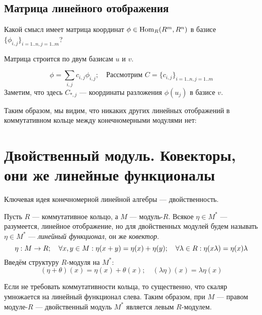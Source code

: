 \documentclass[a4paper]{report}
\begin{document}
    \subsection{Матрица линейного отображения}
    Какой смысл имеет матрица координат $\phi \in \Hom_R(\ind{}R{^m}, \ind{}R{^n})$ в базисе $\{\phi_{i,j}\}_{i = 1..n, j = 1..m}$?

    Матрица строится по двум базисам $u$ и $v$.

    \[\phi = \sum\limits_{i,j}c_{i,j}\phi_{i,j}; \quad \text{Рассмотрим } C = \{c_{i,j}\}_{i=1..n,j=1..m}\]
    Заметим, что здесь $C_{*,j}$ --- координаты разложения $\phi(u_j)$ в базисе $v$.

    Таким образом, мы видим, что никаких других линейных отображений в коммутативном кольце между конечномерными модулями нет:


    \section{Двойственный модуль. Ковекторы, они же линейные функционалы}
    Ключевая идея конечномерной линейной алгебры --- двойственность.

    Пусть $R$ --- коммутативное кольцо, а $M$ --- модуль-$R$.
    Всякое $\eta \in M^*$ --- разумеется, линейное отображение, но для двойственных модулей будем называть $\eta \in M^*$ --- \emph{линейный функционал}, он же \emph{ковектор}.
    \[\eta: M \rightarrow R;\quad \forall x, y \in M: \eta(x + y) = \eta(x) + \eta(y);\quad \forall \lambda \in R: \eta(x \lambda) = \eta(x) \lambda\]
    Введём структуру $R$-модуля на $M^*$:
    \[(\eta + \theta)(x) = \eta(x) + \theta(x); \quad (\lambda \eta)(x) = \lambda \eta(x)\]

    Если не требовать коммутативности кольца, то существенно, что скаляр умножается на линейный функционал слева.
    Таким образом, при $M$ --- правом модуле-$R$ --- двойственный модуль $M^*$ является левым $R$-модулем.
\end{document}
